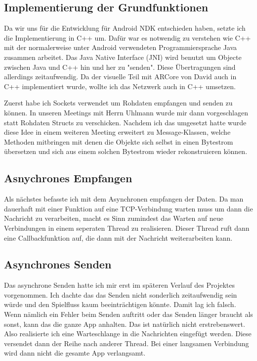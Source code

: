 \subsection{Implementierung der Grundfunktionen}
Da wir uns für die Entwicklung für Android NDK entschieden haben, setzte ich die Implementierung in C++ um.
Dafür war es notwendig zu verstehen wie C++ mit der normalerweise unter Android verwendeten Programmiersprache Java
zusammen arbeitet.
Das Java Native Interface (JNI) wird benutzt um Objecte zwischen Java und C++ hin und her zu "senden". Diese Übertragungen sind allerdings
zeitaufwendig. Da der visuelle Teil mit ARCore von David auch in C++ implementiert wurde, wollte ich das Netzwerk auch in C++ umsetzen.
\par
Zuerst habe ich Sockets verwendet um Rohdaten empfangen und senden zu können.
In unseren Meetings mit Herrn Uhlmann wurde mir dann vorgeschlagen statt Rohdaten Structs zu verschicken.
Nachdem ich das umgesetzt hatte wurde diese Idee in einem weiteren Meeting erweitert zu Message-Klassen, welche Methoden mitbringen
mit denen die Objekte sich selbst in einen Bytestrom übersetzen und sich aus einem solchen Bytestrom wieder rekonstruieren können.
\subsection{Asnychrones Empfangen}
Als nächstes befasste ich mit dem Asynchronen empfangen der Daten. Da man dauerhaft mit einer Funktion auf eine TCP-Verbindung warten muss
um dann die Nachricht zu verarbeiten, macht es Sinn zumindest das Warten auf neue Verbindungen in einem seperaten Thread zu realisieren.
Dieser Thread ruft dann eine Callbackfunktion auf, die dann mit der Nachricht weiterarbeiten kann.
\subsection{Asynchrones Senden}
Das asynchrone Senden hatte ich mir erst im späteren Verlauf des Projektes vorgenommen. Ich dachte das das Senden nicht sonderlich
zeitaufwendig sein würde und den Spielfluss kaum beeinträchtigen könnte. Damit lag ich falsch. Wenn nämlich ein Fehler beim Senden
auftritt oder das Senden länger braucht als sonst, kann das die ganze App anhalten. Das ist natürlich nicht erstrebenswert.
Also realisierte ich eine Warteschlange in die Nachrichten eingefügt werden. Diese versendet dann der Reihe nach anderer Thread.
Bei einer langsamen Verbindung wird dann nicht die gesamte App verlangsamt.
